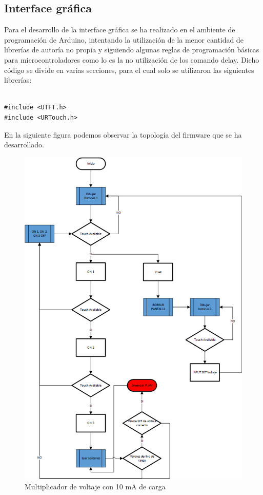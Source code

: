 \subsection{Interface gráfica}
Para el desarrollo de la interface gráfica se ha realizado en el ambiente de programación de Arduino, intentando la utilización de la menor cantidad de librerías de autoría no propia y siguiendo algunas reglas de programación básicas para microcontroladores como lo es la no utilización de los comando delay. Dicho código se divide en varias secciones, para el cual solo se utilizaron las siguientes librerías:

\begin{verbatim}

#include <UTFT.h>
#include <URTouch.h>

\end{verbatim}

En la siguiente figura podemos observar la topología del firmware que se ha desarrollado.\\

\begin{figure}[H]
\centering
\includegraphics[width=12cm]{Capitulo3/figs/diagramafir.png}
\caption{Multiplicador de voltaje con 10 mA de carga}
\end{figure}


